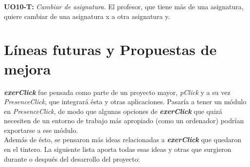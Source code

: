\textbf{UO10-T:} \textit{Cambiar de asignatura.} El profesor, que tiene más de una asignatura, quiere cambiar de una asignatura x a otra asignatura y.\\

\section{Líneas futuras y Propuestas de mejora}

\textit{\textbf{exerClick}} fue pensada como parte de un proyecto mayor, \textit{pClick} y a su vez \textit{PresenceClick}, que integrará ésta y otras aplicaciones. Pasaría a tener un módulo en \textit{PresenceClick}, de modo que algunas opciones de \textit{\textbf{exerClick}} que quizá necesiten de un entorno de trabajo más apropiado (como un ordenador) podrían exportarse a ese módulo.\\

Además de ésto, se pensaron más ideas relacionadas a \textit{\textbf{exerClick}} que quedaron en el tintero. La siguiente lista aporta todas esas ideas y otras que surgieron durante o después del desarrollo del proyecto:

